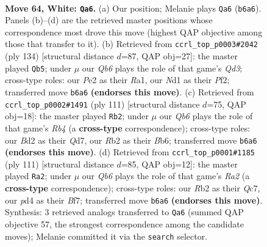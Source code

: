 \documentclass[11pt]{article}
\begin{document}
\clearpage

\begin{figure}[p]\centering
\begin{subfigure}{0.46\textwidth}\centering
\resizebox{\linewidth}{!}{%
\newchessgame
\chessboard[
  setfen={8/3qbrk1/1Q6/P1pn1p1p/3p1Pp1/8/1R1BP2P/3N2K1 w - - 3 64},
  showmover=false,
  pgfstyle=straightmove, color=movearrow, markmove={b6-a6}
]}
\caption{}
\end{subfigure}\hfill
\begin{subfigure}{0.46\textwidth}\centering
\resizebox{\linewidth}{!}{%
\newchessgame
\chessboard[
  setfen={1r5k/4q3/1p1p3P/b1nPpBp1/4P1N1/3Q4/5PK1/R7 w - - 3 68},
  showmover=false,
  pgfstyle=straightmove, color=movearrow, markmove={d3-b5}
]}
\caption{}
\end{subfigure}
\\[4pt]
\begin{subfigure}{0.46\textwidth}\centering
\resizebox{\linewidth}{!}{%
\newchessgame
\chessboard[
  setfen={5nk1/p2q2p1/1b5p/1r1p4/3P1PN1/3Q2PP/5B2/3R2K1 b - - 1 56},
  showmover=false,
  pgfstyle=straightmove, color=movearrow, markmove={b5-b2}
]}
\caption{}
\end{subfigure}\hfill
\begin{subfigure}{0.46\textwidth}\centering
\resizebox{\linewidth}{!}{%
\newchessgame
\chessboard[
  setfen={8/r1q2b1k/3pn3/5p1p/2P1pP1P/4Q1P1/2NR3K/5B2 b - - 4 56},
  showmover=false,
  pgfstyle=straightmove, color=movearrow, markmove={a7-a2}
]}
\caption{}
\end{subfigure}
\caption{\textbf{Move 64, White: \texttt{Qa6}.} (a) Our position; Melanie plays \texttt{Qa6} (\texttt{b6a6}). Panels (b)--(d) are the retrieved master positions whose correspondence most drove this move (highest QAP objective among those that transfer to it). (b) Retrieved from \texttt{ccrl\_top\_p0003\#2042} (ply 134) [structural distance $d$=87, QAP obj=27]: the master played \texttt{Qb5}; under $\mu$ our \emph{Qb6} plays the role of that game's \emph{Qd3}; cross-type roles: our \emph{P}e2 as their \emph{R}a1, our \emph{N}d1 as their \emph{P}f2; transferred move \texttt{b6a6} \textbf{(endorses this move)}. (c) Retrieved from \texttt{ccrl\_top\_p0002\#1491} (ply 111) [structural distance $d$=75, QAP obj=18]: the master played \texttt{Rb2}; under $\mu$ our \emph{Qb6} plays the role of that game's \emph{Rb4} (a \textbf{cross-type} correspondence); cross-type roles: our \emph{B}d2 as their \emph{Q}d7, our \emph{R}b2 as their \emph{B}b6; transferred move \texttt{b6a6} \textbf{(endorses this move)}. (d) Retrieved from \texttt{ccrl\_top\_p0001\#1185} (ply 111) [structural distance $d$=85, QAP obj=12]: the master played \texttt{Ra2}; under $\mu$ our \emph{Qb6} plays the role of that game's \emph{Ra2} (a \textbf{cross-type} correspondence); cross-type roles: our \emph{R}b2 as their \emph{Q}c7, our \emph{p}d4 as their \emph{B}f7; transferred move \texttt{b6a6} \textbf{(endorses this move)}. Synthesis: 3 retrieved analogs transferred to \texttt{Qa6} (summed QAP objective 57, the strongest correspondence among the candidate moves); Melanie committed it via the \texttt{search} selector.}
\label{fig:thought-m126}
\end{figure}
\end{document}
